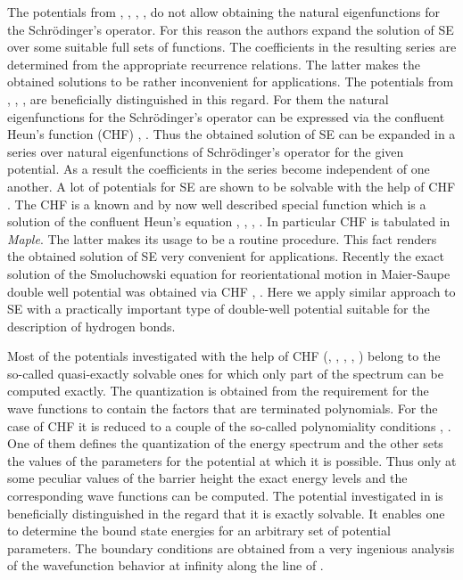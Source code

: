 \documentclass[singlespacing]{elsart}
\begin{document}
The potentials from \cite{Ros32}, \cite{Man35}, \cite{Raz80}, \cite{Kon86}, \cite{Kon95} do not allow obtaining the natural eigenfunctions for the Schr\"odinger's operator. For this reason the authors expand the solution of SE over some suitable full sets of functions. The coefficients in the resulting series are determined from the appropriate recurrence relations. The latter makes the obtained solutions to be rather inconvenient for applications. The potentials from \cite{Xie12}, \cite{Dow13}, \cite{Che13}, \cite{Har14} are beneficially distinguished in this regard. For them the natural eigenfunctions for the Schr\"odinger's operator can be expressed via the confluent Heun's function (CHF) \cite{Ron95}, \cite{Sla00}. Thus the obtained solution of SE can be expanded in a series over natural eigenfunctions of Schr\"odinger's operator for the given potential. As a result the coefficients in the series become independent of one another. A lot of potentials for SE are shown to be solvable with the help of CHF \cite{Ish16}. The CHF is a known and by now well described special function which is a solution of the confluent Heun's equation \cite{Ron95}, \cite{Sla00}, \cite{Fiz12}, \cite{Fiz10}. In particular CHF is tabulated in {\sl {Maple}}. The latter makes its usage to be a routine procedure. This fact renders the obtained solution of SE very convenient for applications. Recently the exact solution of the Smoluchowski equation for reorientational motion in Maier-Saupe double well potential was obtained via CHF \cite{Sit15}, \cite{Sit16}. Here we apply similar approach to SE with a practically important type of double-well potential suitable for the description of hydrogen bonds.

Most of the potentials investigated with the help of CHF (\cite{Xie12}, \cite{Dow13}, \cite{Che13}, \cite{Dow16}, \cite{Dow17}) belong to the so-called quasi-exactly solvable ones for which only part of the spectrum can be computed exactly. The quantization is obtained from the requirement for the wave functions to contain the factors that are terminated polynomials. For the case of CHF it is reduced to a couple of the so-called polynomiality conditions \cite{Fiz12}, \cite{Fiz10}. One of them defines the quantization of the energy spectrum and the other sets the values of the parameters for the potential at which it is possible. Thus only at some peculiar values of the barrier height the exact energy levels and the corresponding wave functions can be computed. The potential investigated in \cite{Har14} is beneficially distinguished in the regard that it is exactly solvable. It enables one to determine the bound state energies for an arbitrary set of potential parameters. The boundary conditions are obtained from a very ingenious analysis of the wavefunction behavior at infinity along the line of \cite{Fer11}.
\end{document}
